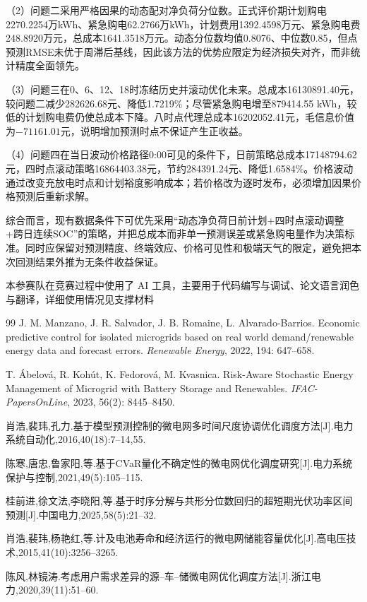 \documentclass[UTF8,a4paper,12pt,fontset=fandol]{ctexart}
\numberwithin{equation}{section}
\begin{document}
（2）问题二采用严格因果的动态配对净负荷分位数。正式评价期计划购电2270.2254万kWh、紧急购电62.2766万kWh，计划费用1392.4598万元、紧急购电费248.8920万元，总成本1641.3518万元。动态分位数均值0.8076、中位数0.85，但点预测RMSE未优于周滞后基线，因此该方法的优势应限定为经济损失对齐，而非统计精度全面领先。

（3）问题三在0、6、12、18时冻结历史并滚动优化未来。总成本16130891.40元，较问题二减少282626.68元、降低1.7219\%；尽管紧急购电增至879414.55 kWh，较低的计划购电费仍使总成本下降。八时点代理总成本16202052.41元，毛信息价值为$-71161.01$元，说明增加预测时点不保证产生正收益。

（4）问题四在当日波动价格路径0:00可见的条件下，日前策略总成本17148794.62元，四时点滚动策略16864403.38元，节约284391.24元、降低1.6584\%。价格波动通过改变充放电时点和计划裕度影响成本；若价格改为逐时发布，必须增加因果价格预测后重新求解。

综合而言，现有数据条件下可优先采用“动态净负荷日前计划+四时点滚动调整+跨日连续SOC”的策略，并把总成本而非单一预测误差或紧急购电量作为决策标准。同时应保留对预测精度、终端效应、价格可见性和极端天气的限定，避免把本次回测结果外推为无条件收益保证。

本参赛队在竞赛过程中使用了 AI 工具，主要用于代码编写与调试、论文语言润色与翻译，详细使用情况见支撑材料

\begin{thebibliography}{99}
J. M. Manzano, J. R. Salvador, J. B. Romaine, L. Alvarado-Barrios.
Economic predictive control for isolated microgrids based on real world demand/renewable energy data and forecast errors.
\textit{Renewable Energy}, 2022, 194: 647--658.

T. Ábelová, R. Kohút, K. Fedorová, M. Kvasnica.
Risk-Aware Stochastic Energy Management of Microgrid with Battery Storage and Renewables.
\textit{IFAC-PapersOnLine}, 2023, 56(2): 8445--8450.

肖浩,裴玮,孔力.基于模型预测控制的微电网多时间尺度协调优化调度方法[J].电力系统自动化,2016,40(18):7--14,55.

陈寒,唐忠,鲁家阳,等.基于CVaR量化不确定性的微电网优化调度研究[J].电力系统保护与控制,2021,49(5):105--115.

桂前进,徐文法,李晓阳,等.基于时序分解与共形分位数回归的超短期光伏功率区间预测[J].中国电力,2025,58(5):21--32.

肖浩,裴玮,杨艳红,等.计及电池寿命和经济运行的微电网储能容量优化[J].高电压技术,2015,41(10):3256--3265.

陈风,林镜涛.考虑用户需求差异的源--车--储微电网优化调度方法[J].浙江电力,2020,39(11):51--60.
\end{thebibliography}
\end{document}
